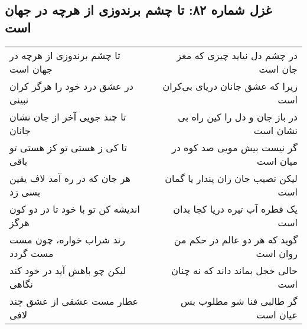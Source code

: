 \begin{center}
\section*{غزل شماره ۸۲: تا چشم برندوزی از هرچه در جهان است}
\label{sec:082}
\begin{longtable}{l p{0.5cm} r}
تا چشم برندوزی از هرچه در جهان است
&&
در چشم دل نیاید چیزی که مغز جان است
\\
در عشق درد خود را هرگز کران نبینی
&&
زیرا که عشق جانان دریای بی‌کران است
\\
تا چند جویی آخر از جان نشان جانان
&&
در باز جان و دل را کین راه بی نشان است
\\
تا کی ز هستی تو کز هستی تو باقی
&&
گر نیست بیش مویی صد کوه در میان است
\\
هر جان که در ره آمد لاف یقین بسی زد
&&
لیکن نصیب جان زان پندار یا گمان است
\\
اندیشه کن تو با خود تا در دو کون هرگز
&&
یک قطره آب تیره دریا کجا بدان است
\\
رند شراب خواره، چون مست مست گردد
&&
گوید که هر دو عالم در حکم من روان است
\\
لیکن چو باهش آید در خود کند نگاهی
&&
حالی خجل بماند داند که نه چنان است
\\
عطار مست عشقی از عشق چند لافی
&&
گر طالبی فنا شو مطلوب بس عیان است
\\
\end{longtable}
\end{center}
